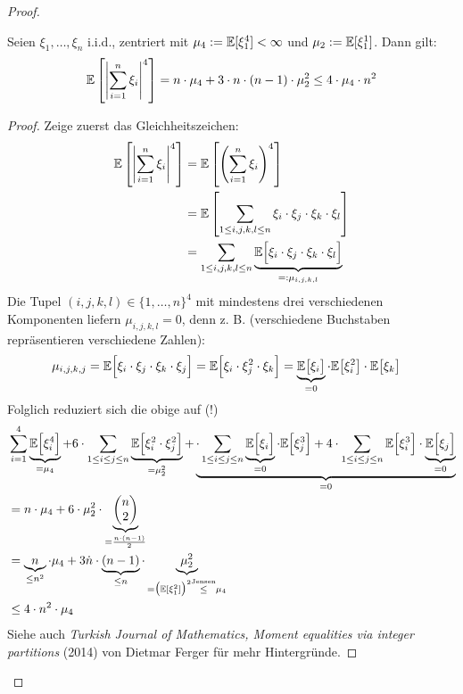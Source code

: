 \begin{proof}
\begin{lem}\enter
Seien $\xi_1,\ldots,\xi_n$ i.i.d., zentriert mit $\mu_4:=\mathbb{E}[\xi_1^4]<\infty$ und $\mu_2:=\mathbb{E}[\xi_1^1]$. Dann gilt:
\begin{align*}
\mathbb{E}\left[\left|\sum\limits_{i=1}^n\xi_i\right|^4\right]=n\cdot\mu_4+3\cdot n\cdot(n-1)\cdot\mu_2^2
\leq 4\cdot\mu_4\cdot n^2
\end{align*}
\end{lem}

\begin{proof}
Zeige zuerst das Gleichheitszeichen:
\begin{align*}
\mathbb{E}\left[\left|\sum\limits_{i=1}^n\xi_i\right|^4\right]
&=\mathbb{E}\left[\left(\sum\limits_{i=1}^n\xi_i\right)^4\right]\\
&=\mathbb{E}\left[\sum\limits_{1\leq i,j,k,l\leq n}\xi_i\cdot\xi_j\cdot\xi_k\cdot\xi_l\right]\\
&=\sum\limits_{1\leq i,j,k,l\leq n}\underbrace{\mathbb{E}\Big[\xi_i\cdot\xi_j\cdot\xi_k\cdot\xi_l\Big]}_{=:\mu_{i,j,k,l}}
\end{align*}
Die Tupel $(i,j,k,l)\in\lbrace1,\ldots,n\rbrace^4$ mit mindestens drei verschiedenen Komponenten liefern $\mu_{i,j,k,l}=0$, denn z. B. (verschiedene Buchstaben repräsentieren verschiedene Zahlen):
\begin{align*}
\mu_{i,j,k,j}
&=\mathbb{E}\Big[\xi_i\cdot\xi_j\cdot\xi_k\cdot\xi_j\Big]
=\mathbb{E}\Big[\xi_i\cdot\xi_j^2\cdot\xi_k\Big]=\underbrace{\mathbb{E}\big[\xi_i\big]}_{=0}\cdot\mathbb{E}\big[\xi_i^2\big]\cdot\mathbb{E}\big[\xi_k\big]
\end{align*}
Folglich reduziert sich die obige auf (!)
\begin{align*}
&\sum\limits_{i=1}^4\underbrace{\mathbb{E}\Big[\xi_i^4\Big]}_{=\mu_4}
+6\cdot\sum\limits_{1\leq i\leq j\leq n}
\underbrace{\mathbb{E}\Big[\xi_i^2\cdot\xi_j^2\Big]}_{=\mu_2^2}
+\underbrace{\cdot\sum\limits_{1\leq i\leq j\leq n}\underbrace{\mathbb{E}\Big[\xi_i\Big]}_{=0}\cdot\mathbb{E}\Big[\xi_j^3\Big]+4\cdot\sum\limits_{1\leq i\leq j\leq n}\mathbb{E}\Big[\xi_i^3\Big]\cdot\underbrace{\mathbb{E}\Big[\xi_j\Big]}_{=0}}_{=0}\\
&=n\cdot\mu_4+6\cdot\mu_2^2\cdot\underbrace{\begin{pmatrix}
n\\ 2
\end{pmatrix}}_{=\frac{n\cdot(n-1)}{2}}\\
&=\underbrace{n}_{\leq n^2}\cdot\mu_4+3\dot n\cdot\underbrace{(n-1)}_{\leq n}\cdot\underbrace{\mu_2^2}_{=\big(\mathbb{E}[\xi_1^2]\big)^2\stackrel{\text{Jensen}}{\leq}\mu_4}\\
&\leq 4\cdot n^2\cdot\mu_4
\end{align*}
Siehe auch \textit{Turkish Journal of Mathematics, Moment equalities via integer partitions} (2014) von Dietmar Ferger für mehr Hintergründe.
\end{proof}


\end{proof}

